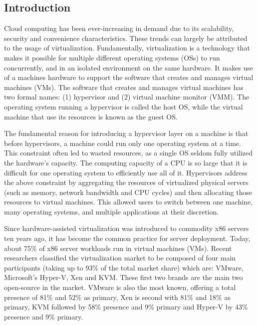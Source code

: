 \documentclass{report}
\begin{document}
\begin{spacing}{1.5}


\newpage
\chapter{Introduction}


{\large
Cloud computing has been ever-increasing in demand due to its scalability, security and convenience characteristics. These trends can largely be attributed to the usage of virtualization. Fundamentally, virtualization is a technology that makes it possible for multiple different operating systems (OSs) to run concurrently, and in an isolated environment on the same hardware. It makes use of a machines hardware to support the software that creates and manages virtual machines (VMs). The software that creates and manages virtual machines has two formal names: (1) hypervisor and (2) virtual machine monitor (VMM). The operating system running a hypervisor is called the host OS, while the virtual machine that use its resources is known as the guest OS.
\newline
}

{\large
The fundamental reason for introducing a hypervisor layer on a machine is that before hypervisors, a machine could run only one operating system at a time. This constraint often led to wasted resources, as a single OS seldom fully utilized the hardware’s capacity. The computing capacity of a CPU is so large that it is difficult for one operating system to efficiently use all of it. Hypervisors address the above constraint by aggregating the resources of virtualized physical servers (such as memory, network bandwidth and CPU cycles) and then allocating those resources to virtual machines. This allowed users to switch between one machine, many operating systems, and multiple applications at their discretion.
\newline
}

{\large
Since hardware-assisted virtualization was introduced to commodity x86 servers ten years ago, it has become the common
practice for server deployment. Today, about 75\% of x86 server workloads run in virtual machines (VMs). Recent researchers classified the virtualization market to be composed of four main participants (taking up to 93\% of the total market share) which are: VMware, Microsoft's Hyper-V, Xen and KVM. These first two brands are the main two open-source in the market. VMware is also the most known, offering a total presence of 81\% and 52\% as primary, Xen is second with 81\% and 18\% as primary, KVM followed by 58\% presence and 9\% primary and Hyper-V by 43\% presence and 9\% primary.
\newline
}



\end{spacing}
\end{document}
